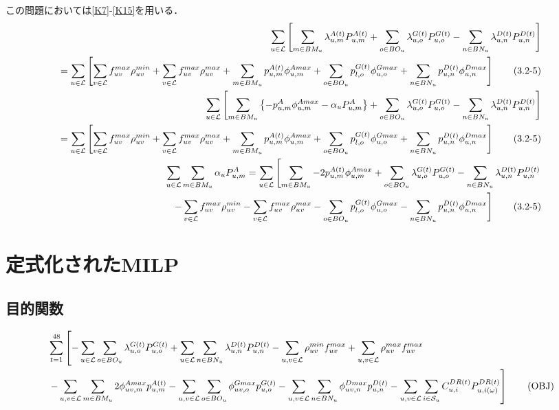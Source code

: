 \documentclass[a4j,10.5pt,fleqn]{jarticle}
\begin{document}
この問題においては\ref{K7}-\ref{K15}を用いる．
\begin{align}
\sum_{u\in \mathcal{L}}\left[\sum_{m\in BM_u}\lambda^{A(t)}_{u,m}P^{A(t)}_{u,m}+\sum_{o\in BO_u}\lambda^{G(t)}_{u,o}P^{G(t)}_{u,o}-\sum_{n\in BN_u}\lambda^{D(t)}_{u,n}P^{D(t)}_{u,n}\right] \notag\\
=\sum_{u\in \mathcal{L}}\left[\sum_{v\in \mathcal{L}}f_{uv}^{max}\rho_{uv}^{min}+\sum_{v\in \mathcal{L}}f_{uv}^{max}\rho_{uv}^{max}+\sum_{m\in BM_u}p_{u,m}^{A(t)}\phi_{u,m}^{Amax}+\sum_{o\in BO_u}p_{l,o}^{G(t)}\phi_{u,o}^{Gmax}+\sum_{n\in BN_u}p_{u,n}^{D(t)}\phi_{u,n}^{Dmax}\right] \tag{3.2-5}\label{3.2-5}\\
\sum_{u\in \mathcal{L}}\left[\sum_{m\in BM_u}\left\{-p_{u,m}^A\phi_{u,m}^{Amax}-\alpha_uP_{u,m}^A\right\}+\sum_{o\in BO_u}\lambda^{G(t)}_{u,o}P^{G(t)}_{u,o}-\sum_{n\in BN_u}\lambda^{D(t)}_{u,n}P^{D(t)}_{u,n}\right] \notag\\
=\sum_{u\in \mathcal{L}}\left[\sum_{v\in \mathcal{L}}f_{uv}^{max}\rho_{uv}^{min}+\sum_{v\in \mathcal{L}}f_{uv}^{max}\rho_{uv}^{max}+\sum_{m\in BM_u}p_{u,m}^{A(t)}\phi_{u,m}^{Amax}+\sum_{o\in BO_u}p_{l,o}^{G(t)}\phi_{u,o}^{Gmax}+\sum_{n\in BN_u}p_{u,n}^{D(t)}\phi_{u,n}^{Dmax}\right] \tag{3.2-5}\label{3.2-5}\\
\sum_{u\in \mathcal{L}}\sum_{m\in BM_u}\alpha_uP_{u,m}^A=\sum_{u\in \mathcal{L}}\left[\sum_{m\in BM_u}-2p_{u,m}^{A(t)}\phi_{u,m}^{Amax}+\sum_{o\in BO_u}\lambda^{G(t)}_{u,o}P^{G(t)}_{u,o}-\sum_{n\in BN_u}\lambda^{D(t)}_{u,n}P^{D(t)}_{u,n}\right.\notag\\
\left.-\sum_{v\in \mathcal{L}}f_{uv}^{max}\rho_{uv}^{min}-\sum_{v\in \mathcal{L}}f_{uv}^{max}\rho_{uv}^{max}-\sum_{o\in BO_u}p_{l,o}^{G(t)}\phi_{u,o}^{Gmax}-\sum_{n\in BN_u}p_{u,n}^{D(t)}\phi_{u,n}^{Dmax}\right] \tag{3.2-5}\label{3.2-5}
\end{align}

\newpage
\section{定式化されたMILP}
\subsection{目的関数}
\begin{align}
&\sum_{t=1}^{48} \left[-\sum_{u\in \mathcal{L}} \sum_{o\in BO_u}\lambda_{u,o}^{G(t)}P_{u,o}^{G(t)}+\sum_{u\in \mathcal{L}} \sum_{n\in BN_u}\lambda_{u,n}^{D(t)}P_{u,n}^{D(t)}-\sum_{u,v\in \mathcal{L}}\rho_{uv}^{min}f_{uv}^{max}+\sum_{u,v\in \mathcal{L}}\rho_{uv}^{max}f_{uv}^{max}
\notag \right. \\
&\left.-\sum_{u,v\in \mathcal{L}} \sum_{m\in BM_u}2\phi_{uv,m}^{Amax}p_{u,m}^{A(t)}-\sum_{u,v\in \mathcal{L}} \sum_{o\in BO_u}\phi_{uv,o}^{Gmax}p_{u,o}^{G(t)}-\sum_{u,v\in \mathcal{L}} \sum_{n\in BN_u}\phi_{uv,n}^{Dmax}p_{u,n}^{D(t)}-\sum_{u,v\in \mathcal{L}}\sum_{i\in \mathcal{S}_u}C_{u,i}^{DR(t)}P_{u,i(\omega)}^{DR(t)}\right]\tag{OBJ}
\end{align}
\end{document}
